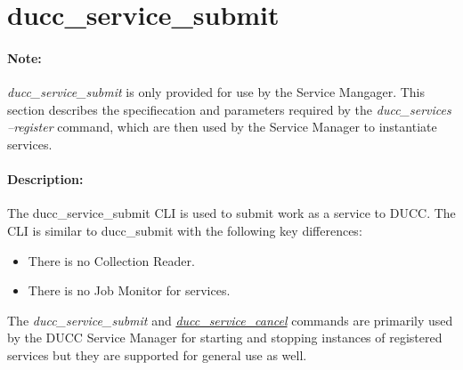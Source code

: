 % 
% 
% 
% 
\ifpdf
\else
{}
\fi
    \section{ducc\_service\_submit}
    \label{sec:cli.service-submit}
    \paragraph{Note:}  {\em ducc\_service\_submit} is only provided for use by the
    Service Mangager. This section describes the specifiecation and parameters
    required by the {\em ducc\_services --register} command, which are then used
    by the Service Manager to instantiate services.

    \paragraph{Description:}
    The ducc\_service\_submit CLI is used to submit work as a service to DUCC. The CLI is similar to
    ducc\_submit with the following key differences:
    
    \begin{itemize}
        \item There is no Collection Reader. 
        \item There is no Job Monitor  for services.
    \end{itemize}
        
    The {\em ducc\_service\_submit} and \hyperref[sec:cli.service-cancel]{{\em
        ducc\_service\_cancel}} commands are primarily used by the DUCC Service Manager for starting
    and stopping instances of registered services but they are supported for general use as well.

